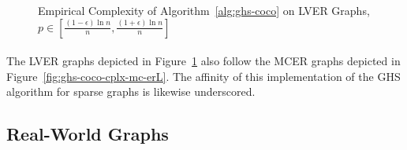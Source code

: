 \documentclass[11pt,epsf]{article}
\begin{document}
{{{\begin{figure}
        \caption{\footnotesize Empirical Complexity of Algorithm~\ref{alg:ghs-coco} on LVER Graphs, $p \in [\frac{(1-\epsilon)\ln n}{n}, \frac{(1+\epsilon)\ln n}{n}]$}
        \label{fig:ghs-coco-cplx-vg-erL}
      \end{figure}
    }
    \paragraph{}{
      The LVER graphs depicted in Figure~\ref{fig:ghs-coco-cplx-vg-erL} also follow the MCER graphs depicted in Figure~\ref{fig:ghs-coco-cplx-mc-erL}.
      The affinity of this implementation of the GHS algorithm for sparse graphs is likewise underscored.
    }
  }
  \subsection{Real-World Graphs}{
}}
\end{document}
